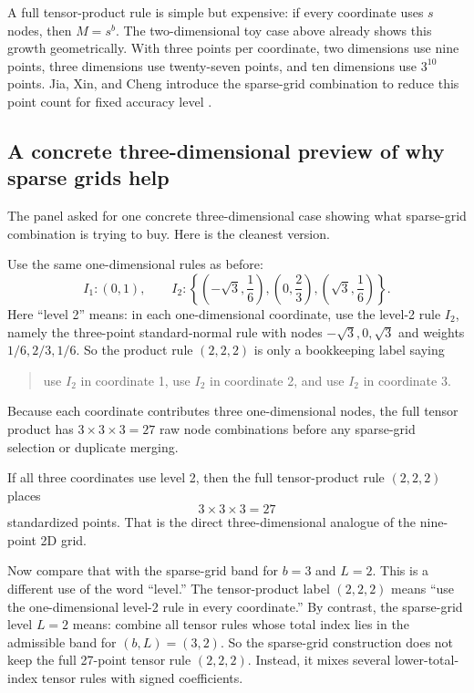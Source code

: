\documentclass[11pt]{article}
\numberwithin{equation}{section}
\begin{document}
A full tensor-product rule is simple but expensive: if every coordinate uses
\(s\) nodes, then \(M=s^b\).  The two-dimensional toy case above already shows
this growth geometrically.  With three points per coordinate, two dimensions use
nine points, three dimensions use twenty-seven points, and ten dimensions use
\(3^{10}\) points.  Jia, Xin, and Cheng introduce the sparse-grid
combination to reduce this point count for fixed accuracy level
\cite[Section 3]{jia2012sparsegrid}.

\subsection{A concrete three-dimensional preview of why sparse grids help}
\label{subsec:p37-3d-preview}

The panel asked for one concrete three-dimensional case showing what sparse-grid
combination is trying to buy.  Here is the cleanest version.

Use the same one-dimensional rules as before:
\begin{equation}
  I_1:(0,1),
  \qquad
  I_2:\left\{\left(-\sqrt3,\frac16\right),\left(0,\frac23\right),
  \left(\sqrt3,\frac16\right)\right\}.
  \label{eq:p37-level1-level2-rules}
\end{equation}
Here ``level 2'' means: in each one-dimensional coordinate, use the level-2 rule
\(I_2\), namely the three-point standard-normal rule with nodes
\(-\sqrt3,0,\sqrt3\) and weights \(1/6,2/3,1/6\).  So the product rule
\((2,2,2)\) is only a bookkeeping label saying
\begin{quote}
use \(I_2\) in coordinate 1, use \(I_2\) in coordinate 2, and use \(I_2\) in
coordinate 3.
\end{quote}
Because each coordinate contributes three one-dimensional nodes, the full tensor
product has \(3\times 3\times 3=27\) raw node combinations before any sparse-grid
selection or duplicate merging.

If all three coordinates use level 2, then the full tensor-product rule
\((2,2,2)\) places
\begin{equation}
  3\times 3\times 3 = 27
  \label{eq:p37-27-points}
\end{equation}
standardized points.  That is the direct three-dimensional analogue of the
nine-point 2D grid.

Now compare that with the sparse-grid band for \(b=3\) and \(L=2\).  This is a
different use of the word ``level.''  The tensor-product label \((2,2,2)\)
means ``use the one-dimensional level-2 rule in every coordinate.''  By
contrast, the sparse-grid level \(L=2\) means: combine all tensor rules whose
total index lies in the admissible band for \((b,L)=(3,2)\).  So the sparse-grid
construction does not keep the full 27-point tensor rule \((2,2,2)\).  Instead,
it mixes several lower-total-index tensor rules with signed coefficients.
\end{document}
